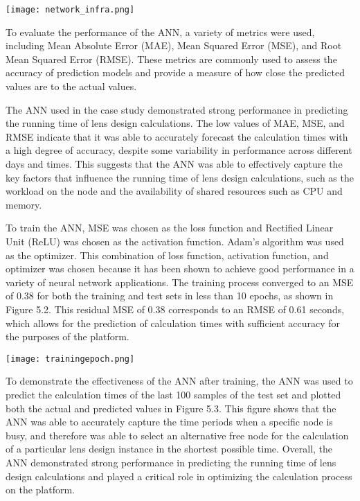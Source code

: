 \documentclass[10pt,a4paper]{report}
\begin{document}
\begin{center}
    \texttt{[image: network\_infra.png]}
\end{center}

\large\justify To evaluate the performance of the ANN, a variety of metrics were used, including Mean Absolute Error (MAE), Mean Squared Error (MSE), and Root Mean Squared Error (RMSE). These metrics are commonly used to assess the accuracy of prediction models and provide a measure of how close the predicted values are to the actual values.

\large\justify The ANN used in the case study demonstrated strong performance in predicting the running time of lens design calculations. The low values of  MAE, MSE, and RMSE indicate that it was able to accurately forecast the calculation times with a high degree of accuracy, despite some variability in performance across different days and times. This suggests that the ANN was able to effectively capture the key factors that influence the running time of lens design calculations, such as the workload on the node and the availability of shared resources such as CPU and memory.

\large\justify To train the ANN, MSE was chosen as the loss function and Rectified Linear Unit (ReLU) was chosen as the activation function. Adam's algorithm was used as the optimizer. This combination of loss function, activation function, and optimizer was chosen because it has been shown to achieve good performance in a variety of neural network applications. The training process converged to an MSE of 0.38 for both the training and test sets in less than 10 epochs, as shown in Figure 5.2. This residual MSE of 0.38 corresponds to an RMSE of 0.61 seconds, which allows for the prediction of calculation times with sufficient accuracy for the purposes of the platform.

\begin{center}
    \texttt{[image: trainingepoch.png]}
\end{center}

\large\justify To demonstrate the effectiveness of the ANN after training, the ANN was used to predict the calculation times of the last 100 samples of the test set and plotted both the actual and predicted values in Figure 5.3. This figure shows that the ANN was able to accurately capture the time periods when a specific node is busy, and therefore was able to select an alternative free node for the calculation of a particular lens design instance in the shortest possible time. Overall, the ANN demonstrated strong performance in predicting the running time of lens design calculations and played a critical role in optimizing the calculation process on the platform.
\end{document}
